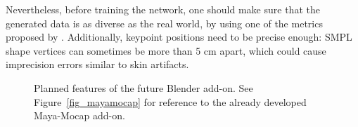 Nevertheless, before training the network, one should make sure that the generated data is as diverse as the real world, by using one of the metrics proposed by \cite{Borji2019, Borji2022}. Additionally, keypoint positions need to be precise enough: SMPL shape vertices can sometimes be more than 5 cm apart, which could cause imprecision errors similar to skin artifacts. 


\begin{figure}[hbtp]
      \centering
      \caption{Planned features of the future Blender add-on. See Figure~\ref{fig_mayamocap} for reference to the already developed Maya-Mocap add-on.}
      \label{fig_blendermocap}
\end{figure}




